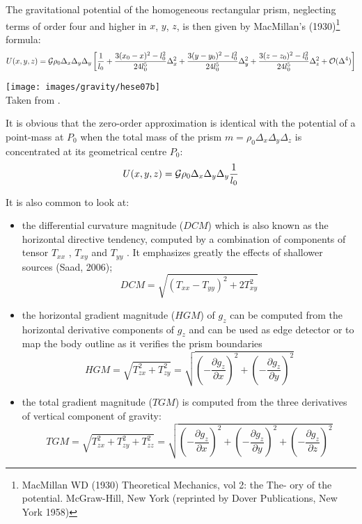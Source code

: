 The gravitational potential of the homogeneous rectangular prism, 
neglecting terms of order four and higher in $x$, $y$, $z$, 
is then given by MacMillan's (1930)\footnote{MacMillan WD (1930) Theoretical Mechanics, vol 2: the The-
ory of the potential. McGraw-Hill, New York (reprinted by Dover Publications, New York 1958)} formula:
\[
U(x,y,z) = {\cal G} \rho_0 \Delta_x \Delta_y \Delta_y
\left[
\frac{1}{l_0}
+ \frac{3(x_0-x)^2-l_0^2}{24l_0^5}\Delta_x^2
+ \frac{3(y-y_0)^2-l_0^2}{24l_0^5}\Delta_y^2
+ \frac{3(z-z_0)^2-l_0^2}{24l_0^5}\Delta_z^2
+ {\cal O}(\Delta^4)
\right]
\]

\begin{center}
\texttt{[image: images/gravity/hese07b]}\\
{\captionfont Taken from \cite{hese07}.}
\end{center}

It is obvious that the zero-order approximation is 
identical with the potential of a point-mass at $P_0$ 
when the total mass of the prism $m=\rho_0 \Delta_x \Delta_y \Delta_z$ 
is concentrated at its geometrical centre $P_0$:
\[
U(x,y,z) = {\cal G} \rho_0 \Delta_x \Delta_y \Delta_y \frac{1}{l_0}
\]

It is also common \cite{duti16} to look at:
\begin{itemize}
\item the differential curvature magnitude ($DCM$) 
which is also known as the horizontal directive tendency, computed by a
combination of components of tensor $T_{xx}$ , $T_{xy}$ and $T_{yy}$ . 
It emphasizes greatly the effects of shallower sources (Saad, 2006);
\[
DCM=\sqrt{ (T_{xx}-T_{yy})^2+ 2 T_{xy}^2 }
\]
\item the horizontal gradient magnitude ($HGM$) of $g_z$ can be computed
from the horizontal derivative components of $g_z$ and can be used
as edge detector or to map the body outline as it verifies the prism
boundaries
\[
HGM=\sqrt{T_{zx}^2+T_{zy}^2} 
=\sqrt{ \left(-\frac{\partial g_z}{\partial x}\right)^2 
+ \left(-\frac{\partial g_z}{\partial y}\right)^2  }
\]

\item the total gradient magnitude ($TGM$) is
computed from the three derivatives of vertical component of gravity:
\[
TGM=\sqrt{T_{zx}^2+T_{zy}^2+T_{zz}^2}
=\sqrt{ \left(-\frac{\partial g_z}{\partial x}\right)^2 
+ \left(-\frac{\partial g_z}{\partial y}\right)^2  
+ \left(-\frac{\partial g_z}{\partial z}\right)^2  }
\]

\end{itemize}

